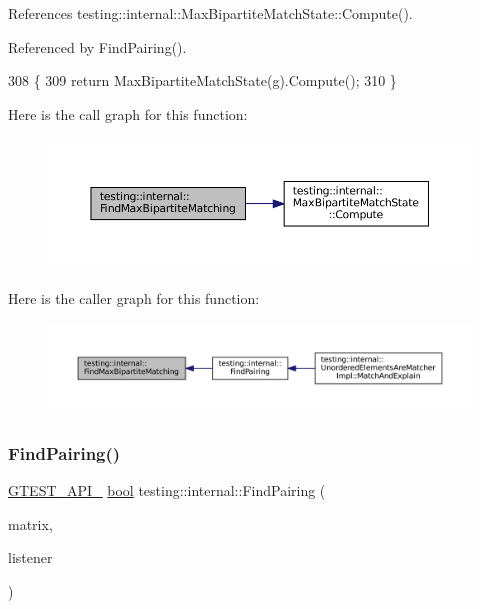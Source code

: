 References testing\+::internal\+::\+Max\+Bipartite\+Match\+State\+::\+Compute().



Referenced by Find\+Pairing().


\begin{DoxyCode}
308                                                \{
309   \textcolor{keywordflow}{return} MaxBipartiteMatchState(g).Compute();
310 \}
\end{DoxyCode}
Here is the call graph for this function\+:
\nopagebreak
\begin{figure}[H]
\begin{center}
\leavevmode
\includegraphics[width=350pt]{namespacetesting_1_1internal_ae30bd8357c179334b2b09b0d689efccc_cgraph}
\end{center}
\end{figure}
Here is the caller graph for this function\+:
\nopagebreak
\begin{figure}[H]
\begin{center}
\leavevmode
\includegraphics[width=350pt]{namespacetesting_1_1internal_ae30bd8357c179334b2b09b0d689efccc_icgraph}
\end{center}
\end{figure}
\mbox{\label{namespacetesting_1_1internal_af2bd2e350b56422a3d9d3b986ac1df0e}} 
\subsubsection{\texorpdfstring{Find\+Pairing()}{FindPairing()}}
{\footnotesize\ttfamily \hyperlink{gtest-port_8h_aa73be6f0ba4a7456180a94904ce17790}{G\+T\+E\+S\+T\+\_\+\+A\+P\+I\+\_\+} \hyperlink{classbool}{bool} testing\+::internal\+::\+Find\+Pairing (\begin{DoxyParamCaption}\item[{const \hyperlink{classtesting_1_1internal_1_1MatchMatrix}{Match\+Matrix} \&}]{matrix,  }\item[{\hyperlink{classtesting_1_1MatchResultListener}{Match\+Result\+Listener} $\ast$}]{listener }\end{DoxyParamCaption})}



